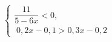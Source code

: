 \begin{ex}[type=ineq_system]
	\begin{condition}
		$\begin{cases} \dfrac{11}{5 - 6x}<0  ,\\
			\; 0,2x - 0,1>0,3x - 0,2  
		\end{cases}$
	\end{condition}
\end{ex}